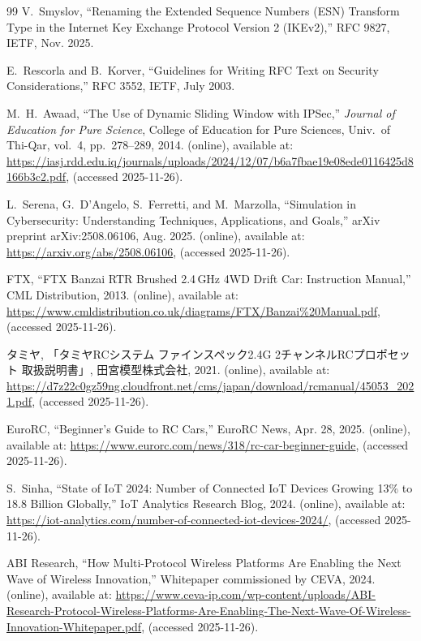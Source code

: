 \documentclass[twocolumn,10pt,a4paper]{jsarticle}
\begin{document}
\begin{thebibliography}{99}
V.~Smyslov,
``Renaming the Extended Sequence Numbers (ESN) Transform Type in the Internet Key Exchange Protocol Version 2 (IKEv2),''
RFC 9827, IETF, Nov. 2025.

E.~Rescorla and B.~Korver,
``Guidelines for Writing RFC Text on Security Considerations,''
RFC 3552, IETF, July 2003.

M.~H.~Awaad,
``The Use of Dynamic Sliding Window with IPSec,''
\textit{Journal of Education for Pure Science},
College of Education for Pure Sciences, Univ.\ of Thi-Qar, vol.~4, pp.~278--289, 2014.
(online), available at: \url{https://iasj.rdd.edu.iq/journals/uploads/2024/12/07/b6a7fbae19e08ede0116425d8166b3c2.pdf},
(accessed 2025-11-26).

L.~Serena, G.~D'Angelo, S.~Ferretti, and M.~Marzolla,
``Simulation in Cybersecurity: Understanding Techniques, Applications, and Goals,''
arXiv preprint arXiv:2508.06106, Aug. 2025.
(online), available at: \url{https://arxiv.org/abs/2508.06106},
(accessed 2025-11-26).

FTX,
``FTX Banzai RTR Brushed 2.4\,GHz 4WD Drift Car: Instruction Manual,''
CML Distribution, 2013. (online),
available at: \url{https://www.cmldistribution.co.uk/diagrams/FTX/Banzai%20Manual.pdf},
(accessed 2025-11-26).

タミヤ,
「タミヤRCシステム ファインスペック2.4G 2チャンネルRCプロポセット 取扱説明書」,
田宮模型株式会社, 2021. (online),
available at: \url{https://d7z22c0gz59ng.cloudfront.net/cms/japan/download/rcmanual/45053_2021.pdf},
(accessed 2025-11-26).

EuroRC,
``Beginner's Guide to RC Cars,''
EuroRC News, Apr. 28, 2025. (online),
available at: \url{https://www.eurorc.com/news/318/rc-car-beginner-guide},
(accessed 2025-11-26).

S.~Sinha,
``State of IoT 2024: Number of Connected IoT Devices Growing 13\% to 18.8 Billion Globally,''
IoT Analytics Research Blog, 2024. (online),
available at: \url{https://iot-analytics.com/number-of-connected-iot-devices-2024/},
(accessed 2025-11-26).

ABI Research,
``How Multi-Protocol Wireless Platforms Are Enabling the Next Wave of Wireless Innovation,''
Whitepaper commissioned by CEVA, 2024. (online),
available at: \url{https://www.ceva-ip.com/wp-content/uploads/ABI-Research-Protocol-Wireless-Platforms-Are-Enabling-The-Next-Wave-Of-Wireless-Innovation-Whitepaper.pdf},
(accessed 2025-11-26).


\end{thebibliography}
\end{document}
